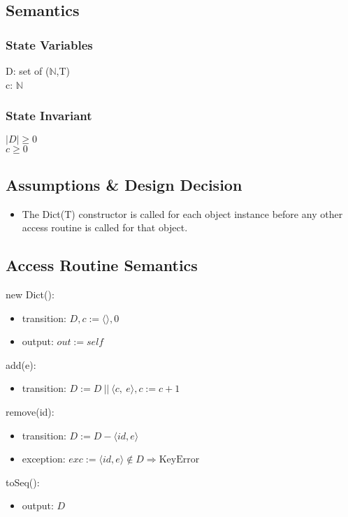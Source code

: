 \documentclass[12pt, titlepage]{article}
\begin{document}
\subsection*{Semantics}
\subsubsection*{State Variables}
D: set of ($\mathbb{N}$,T) \\
c: $\mathbb{N}$
\subsubsection*{State Invariant}
$|D| \geq 0$\\
$c \geq 0$

\subsection*{Assumptions \& Design Decision}
\begin{itemize}
  \item The Dict(T) constructor is called for each object instance before any other access routine is called for that object.
\end{itemize}

\subsection*{Access Routine Semantics}
\noindent new Dict():
\begin{itemize}
    \item transition: $D, c := \langle \rangle, 0$
    
    \item output: $out := self$
\end{itemize}

\noindent add(e):
\begin{itemize}
    \item transition: $D :=  D\ ||\ \langle c,\ e \rangle, c := c + 1$
\end{itemize}

\noindent remove(id):
\begin{itemize}
    \item transition: $D :=  D - \langle id, e \rangle$
    \item exception: $exc := \langle id, e \rangle \notin D \Rightarrow \text{KeyError}$
\end{itemize}

\noindent toSeq():
\begin{itemize}
    \item output: $D$
\end{itemize}
\end{document}
